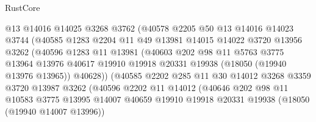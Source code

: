 \begin{lexlean}{RustCore}
\begin{coremodule}
                        @13
                        @14016
                        @14025
                        @3268
                        @3762
                        (@40578
                          @2205
                          @50
                          @13
                          @14016
                          @14023
                          @3744
                          (@40585
                            @1283
                            @2204
                            @11
                            @49
                            @13981
                            @14015
                            @14022
                            @3720
                            @13956
                            @3262
                            (@40596
                              @1283
                              @11
                              @13981
                              (@40603
                                @202
                                @98
                                @11
                                @5763
                                @3775
                                @13964
                                @13976
                                @40617
                                @19910
                                @19918
                                @20331
                                @19938
                                (@18050 (@19940 @13976 @13965))
                                @40628))
                            (@40585
                              @2202
                              @285
                              @11
                              @30
                              @14012
                              @3268
                              @3359
                              @3720
                              @13987
                              @3262
                              (@40596
                                @2202
                                @11
                                @14012
                                (@40646
                                  @202
                                  @98
                                  @11
                                  @10583
                                  @3775
                                  @13995
                                  @14007
                                  @40659
                                  @19910
                                  @19918
                                  @20331
                                  @19938
                                  (@18050 (@19940 @14007 @13996))

\end{coremodule}
\end{lexlean}
